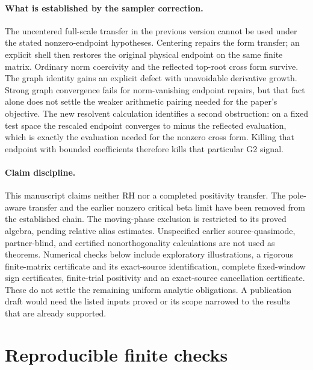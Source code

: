 \documentclass[11pt]{article}
\theoremstyle{remark}
\begin{document}
\paragraph{What is established by the sampler correction.}
The uncentered full-scale transfer in the previous version cannot be used
under the stated nonzero-endpoint hypotheses. Centering repairs the form
transfer; an explicit shell then restores the original physical endpoint
on the same finite matrix. Ordinary norm coercivity and the reflected
top-root cross form survive. The graph identity gains an explicit defect
with unavoidable derivative growth. Strong graph convergence fails for
norm-vanishing endpoint repairs, but that fact alone does not settle the
weaker arithmetic pairing needed for the paper's objective. The new
resolvent calculation identifies a second obstruction: on a fixed test
space the rescaled endpoint converges to minus the reflected evaluation,
which is exactly the evaluation needed for the nonzero cross form.
Killing that endpoint with bounded coefficients therefore kills that
particular G2 signal.

\paragraph{Claim discipline.}
This manuscript claims neither RH nor a completed positivity transfer.
The pole-aware transfer and the earlier nonzero critical beta limit have
been removed from the established chain. The moving-phase exclusion is
restricted to its proved algebra, pending relative alias estimates.
Unspecified earlier source-quasimode, partner-blind, and certified
nonorthogonality calculations are not used as theorems. Numerical checks
below include exploratory illustrations, a rigorous finite-matrix
certificate and its exact-source identification, complete fixed-window
sign certificates, finite-trial positivity and an exact-source
cancellation certificate. These do not settle the remaining uniform
analytic obligations. A publication draft would need the listed inputs
proved or its scope narrowed to the results that are already supported.

\appendix
\section{Reproducible finite checks}\label{app:numerics}
\end{document}

